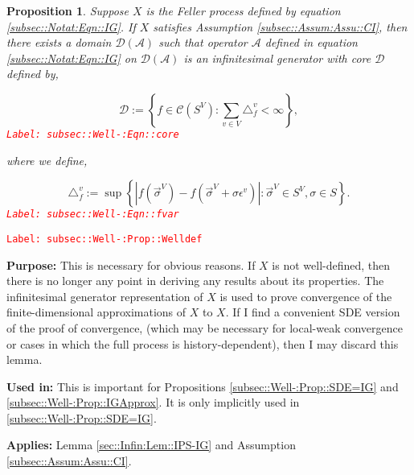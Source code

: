 \documentclass[12pt]{article}
\newcommand{\mc}{\mathcal}
\newcommand{\ep}{\epsilon}
\newcommand{\tr}{\textcolor{red}}
\newcommand{\labe}[1]{\tr{\texttt{Label: #1}}}
\newcommand{\purpose}{\textbf{Purpose: }}
\newcommand{\usein}{\textbf{Used in: }}
\newcommand{\app}{\textbf{Applies: }}
\newcommand{\defeq}{:=}								%
\renewcommand{\v}{v}							%
\renewcommand{\S}{S}							%
\newcommand{\s}{\sigma}							%
\newcommand{\sv}{\vec{\s}}						%
\newcommand{\ev}{\ep}							%
\newcommand{\X}{X}								%
\newcommand{\IG}{\mc{A}}						%
\newcommand{\f}{f}								%
\newcommand{\vind}[1]{^{#1}}					%
\newcommand{\carp}[1]{^{#1}}					%
\newcommand{\vsi}[1]{^{#1}}						%
\newcommand{\core}{\mc{D}}						%
\newcommand{\cont}{\mc{C}}						%
\newcommand{\delt}{\triangle}					%
\newcommand{\deltf}[1]{_{#1}}					%
\newtheorem{prop}[thms]{Proposition}
\begin{document}
\begin{prop}
Suppose \(\X\) is the Feller process defined by equation \eqref{subsec::Notat:Eqn::IG}. If \(\X\) satisfies Assumption \ref{subsec::Assum:Assu::CI}, then there exists a domain \(\core(\IG)\) such that operator \(\IG\) defined in equation \eqref{subsec::Notat:Eqn::IG} on \(\mc{D}(\IG)\) is an infinitesimal generator with core \(\core\) defined by,

\begin{equation}
\core \defeq \left\{f \in \cont(\S\carp{V}): \sum_{\v\in V} \delt\deltf{\f}\vind{\v} < \infty\right\},
\label{subsec::Well-:Eqn::core}
\end{equation}
\labe{subsec::Well-:Eqn::core}

where we define,

\begin{equation}
\delt\deltf{\f}\vind{\v} \defeq \sup\left\{|f(\sv\vsi{V}) - f(\sv\vsi{V}+\s\ev\vind{\v})|: \sv\vsi{V} \in \S\carp{V},\s \in \S\right\}.
\label{subsec::Well-:Eqn::fvar}
\end{equation}
\labe{subsec::Well-:Eqn::fvar}

\label{subsec::Well-:Prop::Welldef}
\end{prop}
\labe{subsec::Well-:Prop::Welldef}

\purpose This is necessary for obvious reasons. If \(\X\) is not well-defined, then there is no longer any point in deriving any results about its properties. The infinitesimal generator representation of \(\X\) is used to prove convergence of the finite-dimensional approximations of \(\X\) to \(\X\). If I find a convenient SDE version of the proof of convergence, (which may be necessary for local-weak convergence or cases in which the full process is history-dependent), then I may discard this lemma.

\usein This is important for Propositions \ref{subsec::Well-:Prop::SDE=IG} and \ref{subsec::Well-:Prop::IGApprox}. It is only implicitly used in \ref{subsec::Well-:Prop::SDE=IG}.

\app Lemma \ref{sec::Infin:Lem::IPS-IG} and Assumption \ref{subsec::Assum:Assu::CI}.
\end{document}
